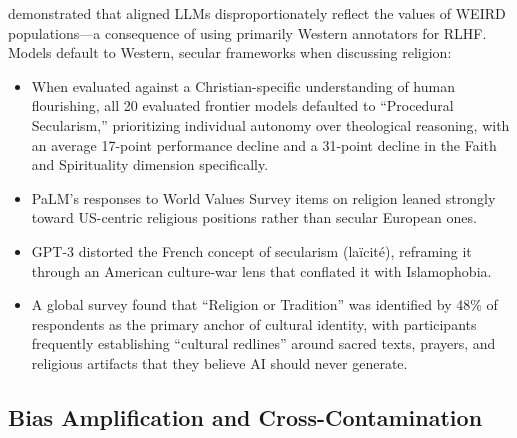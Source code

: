 \documentclass[]{fairmeta}
\begin{document}
\citet{santurkar2023} demonstrated that aligned LLMs disproportionately reflect the values of WEIRD populations---a consequence of using primarily Western annotators for RLHF.  Models default to Western, secular frameworks when discussing religion:
\begin{itemize}
    \item When evaluated against a Christian-specific understanding of human flourishing, all 20 evaluated frontier models defaulted to ``Procedural Secularism,'' prioritizing individual autonomy over theological reasoning, with an average 17-point performance decline and a 31-point decline in the Faith and Spirituality dimension specifically.
    \item PaLM's responses to World Values Survey items on religion leaned strongly toward US-centric religious positions rather than secular European ones.
    \item GPT-3 distorted the French concept of secularism (laïcité), reframing it through an American culture-war lens that conflated it with Islamophobia.
    \item A global survey found that ``Religion or Tradition'' was identified by 48\% of respondents as the primary anchor of cultural identity, with participants frequently establishing ``cultural redlines'' around sacred texts, prayers, and religious artifacts that they believe AI should never generate.
\end{itemize}

\subsection{Bias Amplification and Cross-Contamination}
\end{document}
